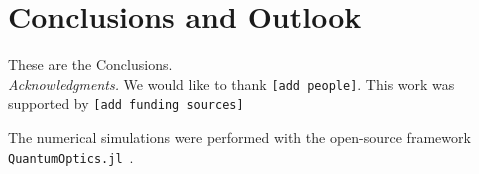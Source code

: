 \documentclass[aps,pra,superscriptaddress,twocolumn]{revtex4-1}
\newcommand{\commentSO}[1]{\texttt{\color{orange}[#1]}}
\begin{document}
\section{Conclusions and Outlook}\label{sec:conclusion}

These are the Conclusions.\\[2ex]

\emph{Acknowledgments.} We would like to thank \commentSO{add people}. This work was supported by \commentSO{add funding sources}

The numerical simulations were performed with the open-source framework \texttt{QuantumOptics.jl}~\cite{kramer_quantumopticsjl_2018}.




\end{document}
